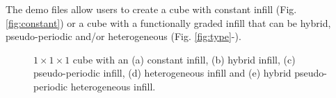 The demo files allow users to create a cube with constant infill (Fig. \ref{fig:constant}) or a cube with a functionally graded infill that can be hybrid, pseudo-periodic and/or heterogeneous (Fig. \ref{fig:type}-).
\begin{figure}[htb]
	
	\centering
	\begin{minipage}{.5\textwidth}
		\hfil {}
		\hfil {}
	\end{minipage}%
	\begin{minipage}{.5\textwidth}
	\end{minipage}
	
	\caption{$1\times1\times1$ cube with an (a) constant infill, (b) hybrid infill, (c) pseudo-periodic infill, (d) heterogeneous infill and (e) hybrid pseudo-periodic heterogeneous infill.}
	\label{fig:demo results}
\end{figure}

